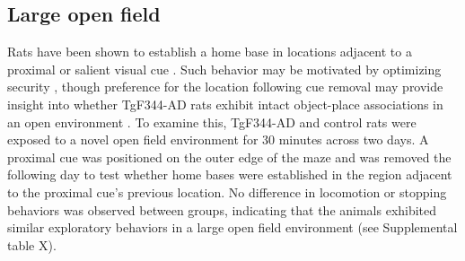 \documentclass[fleqn,10pt]{wlscirep}
\begin{document}
\subsection*{Large open field}
Rats have been shown to establish a home base in locations adjacent to a proximal or salient visual cue \cite{nemati_point_2007,hines_home_2005}. Such behavior may be motivated by optimizing security \cite{whishaw_exploratory_2006}, though preference for the location following cue removal may provide insight into whether TgF344-AD rats exhibit intact object-place associations in an open environment \cite{hines_home_2005}. To examine this, TgF344-AD and control rats were exposed to a novel open field environment for 30 minutes across two days. A proximal cue was positioned on the outer edge of the maze and was removed the following day to test whether home bases were established in the region adjacent to the proximal cue's previous location. No difference in locomotion or stopping behaviors was observed between groups, indicating that the animals exhibited similar exploratory behaviors in a large open field environment (see Supplemental table X).


\end{document}
